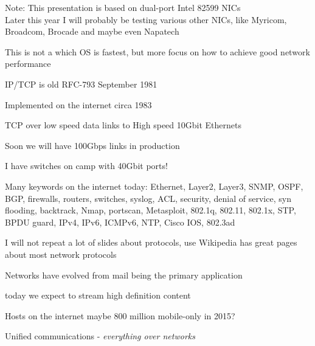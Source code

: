 \documentclass[20pt,landscape,a4paper,footrule]{foils}
\begin{document}
Note: This presentation is based on dual-port Intel 82599 NICs\\
Later this year I will probably be testing various other NICs, like Myricom, Broadcom, Brocade and maybe even Napatech

\vskip 2cm

This is not a which OS is fastest, but more focus on how to achieve good network performance



\begin{list1}
\item IP/TCP is old RFC-793 September 1981
\item Implemented on the internet circa 1983
\item TCP over low speed data links to High speed 10Gbit Ethernets
\item Soon we will have 100Gbps links in production
\item I have switches on camp with 40Gbit ports!
\item Many keywords on the internet today:
Ethernet, Layer2, Layer3, SNMP, OSPF, BGP, firewalls, routers, switches, syslog, ACL, security, denial of service, syn flooding, backtrack, Nmap, portscan, Metasploit, 802.1q, 802.11, 802.1x, STP, BPDU guard, IPv4, IPv6, ICMPv6, NTP, Cisco IOS, 802.3ad
\vskip 5mm
\item I will not repeat a lot of slides about protocols, use Wikipedia has great pages about most network protocols
\end{list1}




\begin{list1}
\item Networks have evolved from mail being the primary application
\item today we expect to stream high definition content
\item Hosts on the internet maybe 800 million mobile-only in 2015?
\item Unified communications - \emph{everything over networks}\\
\end{list1}
\end{document}
